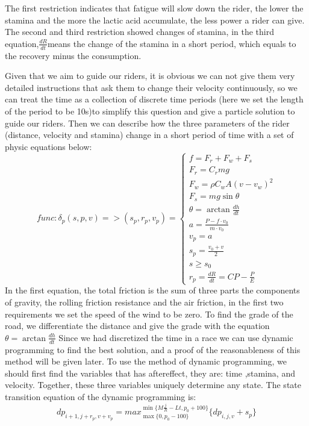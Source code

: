 \documentclass[12pt]{article}
\begin{document}
The first restriction indicates that fatigue will slow down the rider, the lower the stamina and the more the lactic acid accumulate, the less power a rider can give.
The second and third restriction showed changes of stamina, in the third equation,$\frac{d R}{d t}$means the change of the stamina in a short period, which equals to the
recovery minus the consumption.

Given that we aim to guide our riders, it is obvious we can not give them very detailed instructions that ask them to change their velocity continuously, so we can treat the time
as a collection of discrete time periods (here we set the length of the period to be 10s)to simplify this question and give a particle solution to guide our riders.
Then we can describe how the three parameters of the rider (distance, velocity and stamina) change in a short period of time with a set of physic equations below: 
\begin{equation}
    func: \delta_p(s,p,v)=>(  s_p, r_p, v_p)=\left\{
    \begin{array}{c}
        f=F_r+F_w+F_s                     \\%
        F_r=C_rmg                         \\%
        F_w=\rho C_w A(v-v_w)^2           \\%
        F_s=mg\sin \theta                 \\
        \theta=\arctan\frac{d h}{d t}   \\%
        a=\frac{P-f\cdot v_0}{m\cdot v_0} \\
        v_p=a                             \\
        s_p=\frac{v_0+v}{2}               \\
        s\geqslant s_0                    \\
        r_p=\frac{d R}{d t} =CP-\frac{P}{E}
    \end{array}
    \right.
\end{equation}
In the first equation, the total friction is the sum of three parts the components of gravity, the rolling friction resistance and the air friction, 
in the first two requirements we set the speed of the wind to be zero. To find the grade of the road, we differentiate the distance and give the grade with the equation
$\theta=\arctan\frac{d h}{d t}$
Since we had discretized the time in a race we can use dynamic programming to find the best solution, 
and a proof of the reasonableness of this method will be given later.
To use the method of dynamic programming, we should first find the variables that has aftereffect, they are:  time ,stamina, and velocity. Together, these three variables 
uniquely determine any state.
The state transition equation of the dynamic programming is:\begin{equation}dp_{i+1,j+r_p,v+v_p}= max_{\max\{0,p_0-100\}}^{\min\{M\frac{j}{R}-Lt,p_0+100\}}\{dp_{i,j,v}+s_p\}\end{equation}
\end{document}
